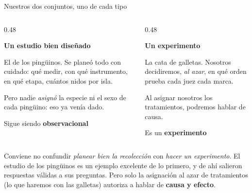 \documentclass[aspectratio=169,10pt]{beamer}
\newcommand{\destaca}[1]{%
  \par\vspace{3pt}\noindent
  \colorbox{azulClaro}{%
    \parbox{\dimexpr\linewidth-2\fboxsep\relax}{\vspace{3pt}#1\vspace{3pt}}}%
  \par\vspace{3pt}}
\begin{document}
\begin{frame}{Nuestros dos conjuntos, uno de cada tipo}
  \begin{columns}[T]
    \begin{column}{0.48\textwidth}
      \destaca{\textbf{Un estudio bien diseñado}\\[4pt]
      {\small El de los pingüinos. Se planeó todo con cuidado: qué medir, con qué
      instrumento, en qué etapa, cuántos nidos por isla.

      \vspace{0.2cm}
      Pero nadie \emph{asignó} la especie ni el sexo de cada pingüino: eso ya venía dado.}}

      \vspace{0.25cm}
      \centering\textcolor{rojoAc}{\small Sigue siendo \textbf{observacional}}
    \end{column}
    \begin{column}{0.48\textwidth}
      \destaca{\textbf{Un experimento}\\[4pt]
      {\small La cata de galletas. Nosotros decidiremos, \emph{al azar}, en qué orden
      prueba cada juez cada marca.

      \vspace{0.2cm}
      Al asignar nosotros los tratamientos, podremos hablar de causa.}}

      \vspace{0.25cm}
      \centering\textcolor{verdeOk}{\small Es un \textbf{experimento}}
    \end{column}
  \end{columns}

  \vspace{0.45cm}
  \destaca{Conviene no confundir \emph{planear bien la recolección} con \emph{hacer un
  experimento}. El estudio de los pingüinos es un ejemplo excelente de lo primero, y de
  ahí salieron respuestas válidas a sus preguntas. Pero solo la asignación al azar de
  tratamientos (lo que haremos con las galletas) autoriza a hablar de \textbf{causa y efecto}.}
\end{frame}
\end{document}
